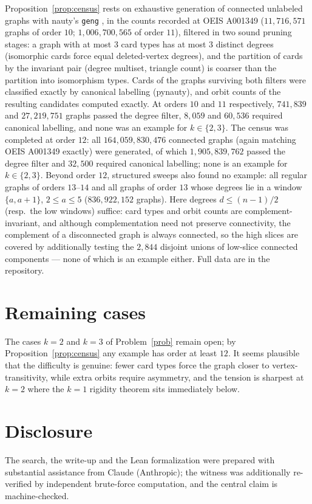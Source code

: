 \documentclass[11pt]{article}
\theoremstyle{remark}
\begin{document}
Proposition~\ref{prop:census} rests on exhaustive generation of connected
unlabeled graphs with \textsf{nauty}'s \texttt{geng} \cite{MP14}, in the
counts recorded at OEIS A001349 ($11{,}716{,}571$ graphs of order $10$;
$1{,}006{,}700{,}565$ of order $11$), filtered in two sound pruning stages:
a graph with at most $3$ card types has at most $3$ distinct degrees
(isomorphic cards force equal deleted-vertex degrees), and the partition of
cards by the invariant pair (degree multiset, triangle count) is coarser
than the partition into isomorphism types. Cards of the graphs surviving
both filters were classified exactly by canonical labelling
(\textsf{pynauty}), and orbit counts of the resulting candidates computed
exactly. At orders $10$ and $11$ respectively, $741{,}839$ and
$27{,}219{,}751$ graphs passed the degree filter, $8{,}059$ and $60{,}536$
required canonical labelling, and none was an example for $k \in \{2,3\}$.
The census was completed at order $12$: all $164{,}059{,}830{,}476$
connected graphs (again matching OEIS A001349 exactly) were generated, of
which $1{,}905{,}839{,}762$ passed the degree filter and $32{,}500$ required
canonical labelling; none is an example for $k \in \{2,3\}$. Beyond order
$12$, structured sweeps also found no example: all regular graphs of orders
$13$--$14$ and all graphs of order $13$ whose degrees lie in a window
$\{a, a+1\}$, $2 \le a \le 5$ ($836{,}922{,}152$ graphs). Here degrees
$d \le (n-1)/2$ (resp.\ the low windows) suffice: card types and orbit
counts are complement-invariant, and although complementation need not
preserve connectivity, the complement of a disconnected graph is always
connected, so the high slices are covered by additionally testing the
$2{,}844$ disjoint unions of low-slice connected components --- none of
which is an example either. Full data are in the repository.

\section{Remaining cases}

The cases $k = 2$ and $k = 3$ of Problem~\ref{prob} remain open; by
Proposition~\ref{prop:census} any example has order at least $12$. It seems
plausible that the difficulty is genuine: fewer card types force the graph
closer to vertex-transitivity, while extra orbits require asymmetry, and
the tension is sharpest at $k = 2$ where the $k = 1$ rigidity theorem sits
immediately below.

\section*{Disclosure}
The search, the write-up and the Lean formalization were prepared with
substantial assistance from Claude (Anthropic); the witness was
additionally re-verified by independent brute-force computation, and the
central claim is machine-checked.
\end{document}
